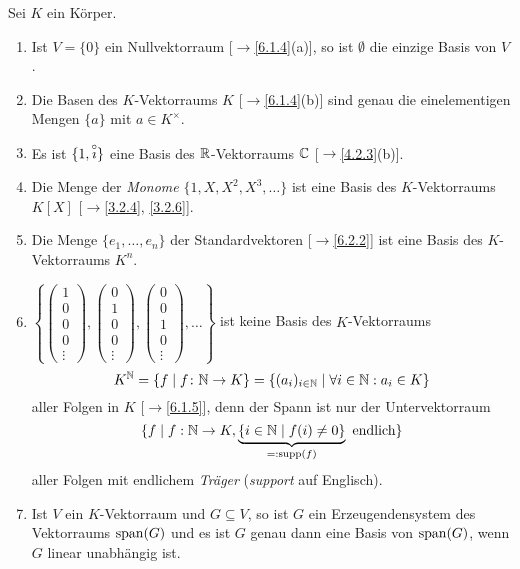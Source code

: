 \documentclass[../../main.tex]{subfiles}
\begin{document}
\begin{bsp}\label{6.2.8}
Sei $K$ ein Körper.
\begin{enumerate}[\normalfont(a)]
\item Ist $V=\{0\}$ ein Nullvektorraum [$\to$\ref{6.1.4}(a)], so ist $\emptyset$ die einzige Basis von $V$.
\item Die Basen des $K$-Vektorraums $K$ [$\to$\ref{6.1.4}(b)] sind genau die einelementigen Mengen $\{a\}$ mit $a\in K^\times$.
\item Es ist $\{1,\overset\circ\imath\}$ eine Basis des $\mathbb R$-Vektorraums $\mathbb C$ [$\to$\ref{4.2.3}(b)].
\item Die Menge der \emph{Monome} $\{1,X,X^2,X^3,\dots\}$ ist eine Basis des $K$-Vektorraums $K[X]$ [$\to$\ref{3.2.4}, \ref{3.2.6}].
\item Die Menge $\{e_1,\dots,e_n\}$ der Standardvektoren [$\to$\ref{6.2.2}] ist eine Basis des $K$-Vektorraums $K^n$.
\item $\left\{\left(\begin{smallmatrix}1\\0\\0\\0\\\vdots\end{smallmatrix}\right),\left(\begin{smallmatrix}0\\1\\0\\0\\\vdots\end{smallmatrix}\right),
\left(\begin{smallmatrix}0\\0\\1\\0\\\vdots\end{smallmatrix}\right),\dots\right\}$ ist keine Basis des $K$-Vektorraums $$K^\mathbb N=\{f\mid f\colon\mathbb N\to K\}=
\{(a_i)_{i\in\mathbb N}\mid\forall i\in\mathbb N:a_i\in K\}$$ aller Folgen in $K$ [$\to$\ref{6.1.5}], denn der Spann ist nur der Untervektorraum
$$\{f\mid f:\mathbb N\to K,\underbrace{\{i\in\mathbb N\mid f(i)\ne0\}}_{=:\operatorname{supp}(f)}\text{ endlich}\}$$
aller Folgen mit endlichem \emph{Träger} (\emph{support} auf Englisch).
\item Ist $V$ ein $K$-Vektorraum und $G\subseteq V$, so ist $G$ ein Erzeugendensystem des Vektorraums $\operatorname{span}(G)$ und es ist $G$ genau dann eine Basis von $\operatorname{span}(G)$, wenn
$G$ linear unabhängig ist.
\end{enumerate}
\end{bsp}
\end{document}
